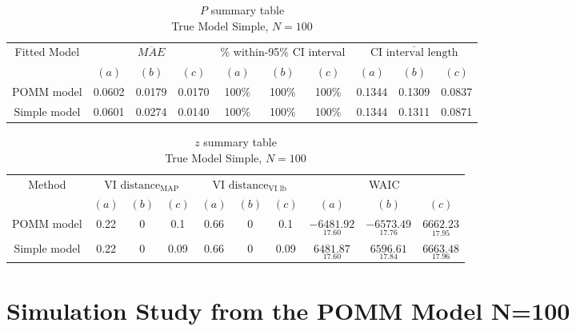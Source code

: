 \documentclass[11pt]{amsart}
\begin{document}
\begin{table}[htbp]
\centering
\caption*{
{\large $P$ summary table} \\ 
{\small True Model Simple, $N=100$}
} 
\begin{tabular}{cccccccccc}
\toprule
\multirow{2}{*}{Fitted Model} & \multicolumn{3}{c}{
$\overline{MAE}$ } & \multicolumn{3}{c}{
$\%$ within-95\% CI interval} & \multicolumn{3}{c}{ $\overline{\text{CI interval length}}$} \\
\cmidrule(lr){2-4} \cmidrule(lr){5-7} \cmidrule(lr){8-10}
& $(a)$ & $(b)$ & $(c)$ & $(a)$ & $(b)$ & $(c)$ & $(a)$ & $(b)$ & $(c)$ \\
\midrule
POMM model  &0.0602&  0.0179 & 0.0170 & 100$\%$  & 100$\%$   & 100$\%$  & 0.1344 & 0.1309 & 0.0837  \\
Simple model & 0.0601 &  0.0274 & 0.0140 & 100$\%$ &100$\%$  & 100$\%$  & 0.1344 & 0.1311 & 0.0871 \\
\bottomrule
\end{tabular}
\label{table:simulations_from_simple}
\end{table}


\begin{table}[htbp]
\centering
\caption*{
{\large $z$ summary table} \\ 
{\small True Model Simple, $N=100$}
} 
\begin{tabular}{cccccccccc}
\toprule
\multirow{2}{*}{Method} & \multicolumn{3}{c}{
VI $\text{distance}_{\text{MAP}}$} & \multicolumn{3}{c}{
VI $\text{distance}_{\text{VI lb}}$} & \multicolumn{3}{c}{WAIC} \\
\cmidrule(lr){2-4} \cmidrule(lr){5-7} \cmidrule(lr){8-10}
& $(a)$ & $(b)$ & $(c)$ & $(a)$ & $(b)$ & $(c)$ & $(a)$ & $(b)$ & $(c)$ \\
\midrule
POMM model  &0.22&  0 & 0.1 & 0.66 & 0  & 0.1 & $\underset{17.60}{-6481.92}$ & $\underset{17.76}{-6573.49}$ & $\underset{17.95}{6662.23}$  \\
Simple model & 0.22 &  0 & 0.09 & 0.66&0 &0.09 & $\underset{17.60}{6481.87}$ & $\underset{17.84}{6596.61}$ & $\underset{17.96}{6663.48}$ \\
\bottomrule
\end{tabular}
\label{table:simulations_from_simple}
\end{table}




\clearpage






\section{Simulation Study from the POMM Model N=100}
\end{document}
